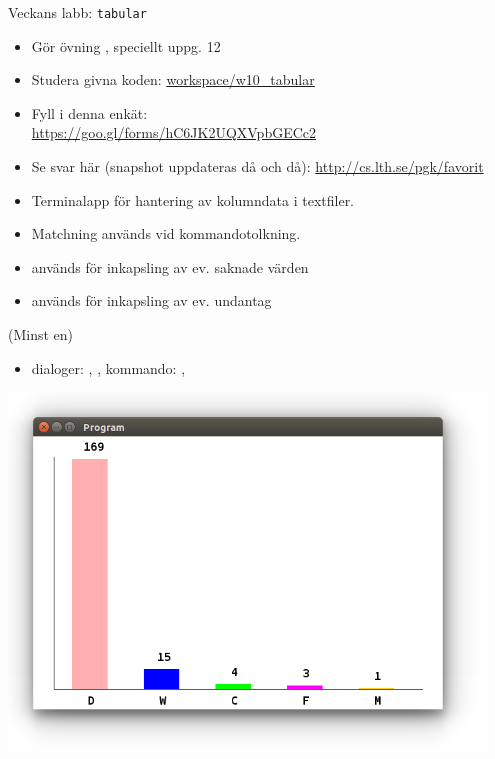\begin{Slide}{Veckans labb: \texttt{tabular}}\SlideFontTiny
\hspace{-2em}\begin{minipage}{0.7\textwidth}
\vspace{0.25em}
\begin{itemize}
\item Gör övning , speciellt uppg. 12
\item Studera givna koden: {\SlideFontTiny \href{https://github.com/lunduniversity/introprog/tree/master/workspace/w10_tabular}{workspace/w10\_tabular}}
\item Fyll i denna enkät:
\\{\SlideFontTiny \url{https://goo.gl/forms/hC6JK2UQXVpbGECc2}}
\item Se svar här (snapshot uppdateras då och då): \url{http://cs.lth.se/pgk/favorit}
\end{itemize}

\begin{itemize}
\item Terminalapp för hantering av kolumndata i textfiler.
\item Matchning används vid kommandotolkning.
\item {} används för inkapsling av ev. saknade värden
\item {} används för inkapsling av ev. undantag
\end{itemize}
 (Minst en)
\begin{itemize}
\item dialoger: , , kommando: , 
\end{itemize}
\end{minipage}
\hfill\begin{minipage}{0.3\textwidth}
\centering
\includegraphics[width=0.95\textwidth]{../img/survey/bar}


\end{minipage}
\end{Slide}

